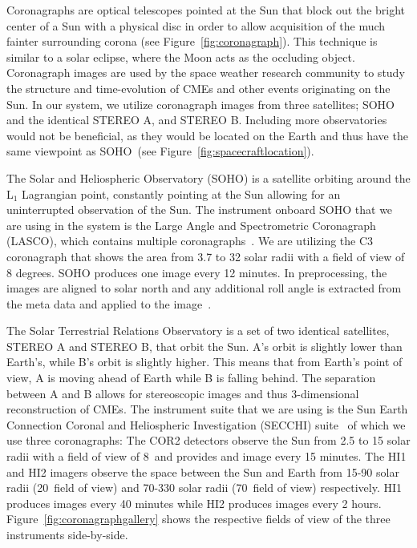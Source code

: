 \documentclass[journal]{vgtc}                %
\begin{document}
Coronagraphs are optical telescopes pointed at the Sun that block out the bright center of a Sun with a physical disc in order to allow acquisition of the much fainter surrounding corona (see Figure~\ref{fig:coronagraph}). This technique is similar to a solar eclipse, where the Moon acts as the occluding object. Coronagraph images are used by the space weather research community to study the structure and time-evolution of CMEs and other events originating on the Sun. In our system, we utilize coronagraph images from three satellites; SOHO and the identical STEREO A, and STEREO B. Including more observatories would not be beneficial, as they would be located on the Earth and thus have the same viewpoint as SOHO~(see Figure~\ref{fig:spacecraftlocation}).

 The Solar and Heliospheric Observatory (SOHO) is a satellite orbiting around the L$_1$ Lagrangian point, constantly pointing at the Sun allowing for an uninterrupted observation of the Sun. The instrument onboard SOHO that we are using in the system is the Large Angle and Spectrometric Coronagraph (LASCO), which contains multiple coronagraphs~\cite{Brueckner:1995cb}. We are utilizing the C3 coronagraph that shows the area from 3.7 to 32 solar radii with a field of view of 8 degrees. SOHO produces one image every 12 minutes. In preprocessing, the images are aligned to solar north and any additional roll angle is extracted from the meta data and applied to the image~\cite{wells1981fits}.

 The Solar Terrestrial Relations Observatory is a set of two identical satellites, STEREO A and STEREO B, that orbit the Sun. A's orbit is slightly lower than Earth's, while B's orbit is slightly higher. This means that from Earth's point of view, A is moving ahead of Earth while B is falling behind. The separation between A and B allows for stereoscopic images and thus 3-dimensional reconstruction of CMEs. The instrument suite that we are using is the Sun Earth Connection Coronal and Heliospheric Investigation (SECCHI) suite~\cite{Socker:2000ic} of which we use three coronagraphs: The COR2 detectors observe the Sun from 2.5 to 15 solar radii with a field of view of 8\degree\ and provides and image every 15 minutes. The HI1 and HI2 imagers observe the space between the Sun and Earth from 15-90 solar radii (20\degree\ field of view) and 70-330 solar radii (70\degree\ field of view) respectively. HI1 produces images every 40 minutes while HI2 produces images every 2 hours. Figure~\ref{fig:coronagraphgallery} shows the respective fields of view of the three instruments side-by-side.
\end{document}
